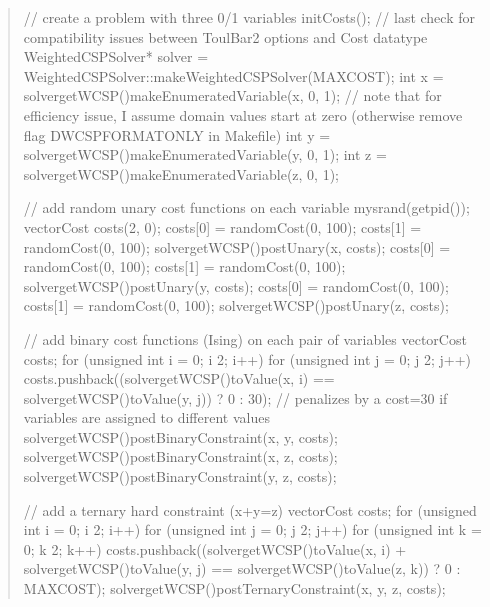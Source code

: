 \documentclass[letterpaper,10pt,openany,oneside,english]{sphinxmanual}
\begin{document}
\begin{quote}
\begin{sphinxVerbatim}[commandchars=\\\{\}]
    // create a problem with three 0/1 variables
    initCosts(); // last check for compatibility issues between ToulBar2 options and Cost data\PYGZhy{}type
    WeightedCSPSolver* solver = WeightedCSPSolver::makeWeightedCSPSolver(MAX\PYGZus{}COST);
    int x = solver\PYGZhy{}\PYGZgt{}getWCSP()\PYGZhy{}\PYGZgt{}makeEnumeratedVariable(\PYGZdq{}x\PYGZdq{}, 0, 1); // note that for efficiency issue, I assume domain values start at zero (otherwise remove flag \PYGZhy{}DWCSPFORMATONLY in Makefile)
    int y = solver\PYGZhy{}\PYGZgt{}getWCSP()\PYGZhy{}\PYGZgt{}makeEnumeratedVariable(\PYGZdq{}y\PYGZdq{}, 0, 1);
    int z = solver\PYGZhy{}\PYGZgt{}getWCSP()\PYGZhy{}\PYGZgt{}makeEnumeratedVariable(\PYGZdq{}z\PYGZdq{}, 0, 1);

    // add random unary cost functions on each variable
    mysrand(getpid());
    \PYGZob{}
        vector\PYGZlt{}Cost\PYGZgt{} costs(2, 0);
        costs[0] = randomCost(0, 100);
        costs[1] = randomCost(0, 100);
        solver\PYGZhy{}\PYGZgt{}getWCSP()\PYGZhy{}\PYGZgt{}postUnary(x, costs);
        costs[0] = randomCost(0, 100);
        costs[1] = randomCost(0, 100);
        solver\PYGZhy{}\PYGZgt{}getWCSP()\PYGZhy{}\PYGZgt{}postUnary(y, costs);
        costs[0] = randomCost(0, 100);
        costs[1] = randomCost(0, 100);
        solver\PYGZhy{}\PYGZgt{}getWCSP()\PYGZhy{}\PYGZgt{}postUnary(z, costs);
    \PYGZcb{}

    // add binary cost functions (Ising) on each pair of variables
    \PYGZob{}
        vector\PYGZlt{}Cost\PYGZgt{} costs;
        for (unsigned int i = 0; i \PYGZlt{} 2; i++) \PYGZob{}
            for (unsigned int j = 0; j \PYGZlt{} 2; j++) \PYGZob{}
                costs.push\PYGZus{}back((solver\PYGZhy{}\PYGZgt{}getWCSP()\PYGZhy{}\PYGZgt{}toValue(x, i) == solver\PYGZhy{}\PYGZgt{}getWCSP()\PYGZhy{}\PYGZgt{}toValue(y, j)) ? 0 : 30); // penalizes by a cost=30 if variables are assigned to different values
            \PYGZcb{}
        \PYGZcb{}
        solver\PYGZhy{}\PYGZgt{}getWCSP()\PYGZhy{}\PYGZgt{}postBinaryConstraint(x, y, costs);
        solver\PYGZhy{}\PYGZgt{}getWCSP()\PYGZhy{}\PYGZgt{}postBinaryConstraint(x, z, costs);
        solver\PYGZhy{}\PYGZgt{}getWCSP()\PYGZhy{}\PYGZgt{}postBinaryConstraint(y, z, costs);
    \PYGZcb{}

    // add a ternary hard constraint (x+y=z)
    \PYGZob{}
        vector\PYGZlt{}Cost\PYGZgt{} costs;
        for (unsigned int i = 0; i \PYGZlt{} 2; i++) \PYGZob{}
            for (unsigned int j = 0; j \PYGZlt{} 2; j++) \PYGZob{}
                for (unsigned int k = 0; k \PYGZlt{} 2; k++) \PYGZob{}
                    costs.push\PYGZus{}back((solver\PYGZhy{}\PYGZgt{}getWCSP()\PYGZhy{}\PYGZgt{}toValue(x, i) + solver\PYGZhy{}\PYGZgt{}getWCSP()\PYGZhy{}\PYGZgt{}toValue(y, j) == solver\PYGZhy{}\PYGZgt{}getWCSP()\PYGZhy{}\PYGZgt{}toValue(z, k)) ? 0 : MAX\PYGZus{}COST);
                \PYGZcb{}
            \PYGZcb{}
        \PYGZcb{}
        solver\PYGZhy{}\PYGZgt{}getWCSP()\PYGZhy{}\PYGZgt{}postTernaryConstraint(x, y, z, costs);
    \PYGZcb{}


\end{sphinxVerbatim}
\end{quote}
\end{document}
